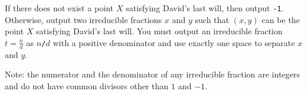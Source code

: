 If there does not exist a point $X$ satisfying David's last will, 
then output \verb+-1+. Otherwise, output two irreducible fractions $x$ 
and $y$ such that $(x,y)$ can be the point $X$ satisfying David's last will. 
You must output an irreducible fraction $t=\frac{n}{d}$ as $n$\verb+/+$d$
with a positive denominator and use exactly one space to separate $x$ and 
$y$.

Note: the numerator and the denominator of any irreducible fraction are integers
and do not have common divisors other than $1$ and $-1$. 
